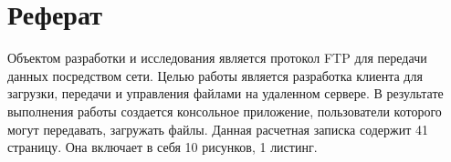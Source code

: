 \section{Реферат}
Объектом разработки и исследования является протокол FTP для передачи данных посредством сети. 
Целью работы является разработка клиента для загрузки, передачи и управления файлами на удаленном сервере.
В результате выполнения работы создается консольное приложение, пользователи которого могут передавать, загружать файлы.
Данная расчетная записка содержит 41 страницу. Она включает в себя 10 рисунков, 1 листинг. 
